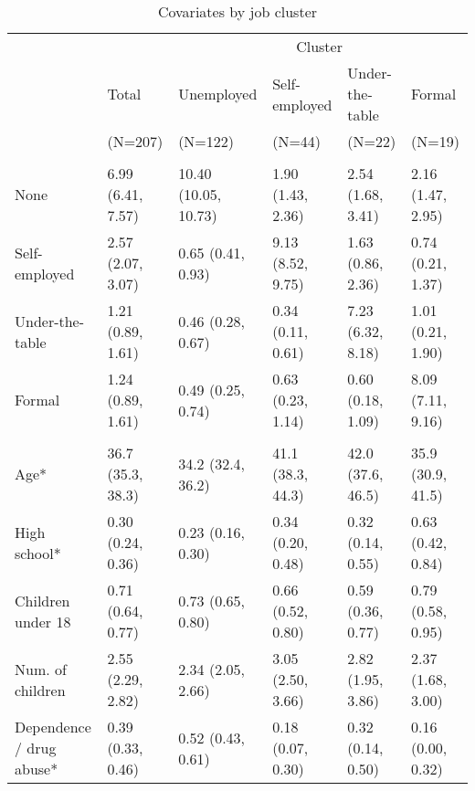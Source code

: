 
\begin{table}[htp]
\scriptsize
\caption{Covariates by job cluster}
\label{tab:desc_job_clusters}
\setlength{\tabcolsep}{5pt}
\renewcommand{\arraystretch}{1.3}
\begin{threeparttable}
\begin{tabular}{llllll}
\hline
\addlinespace[8pt]
& & \multicolumn{4}{c}{Cluster} \\
\addlinespace
\cmidrule(lr){3-6} 
\addlinespace
& \multicolumn{1}{l}{Total} & \multicolumn{1}{l}{Unemployed} & \multicolumn{1}{l}{Self-employed} & \multicolumn{1}{l}{Under-the-table} & \multicolumn{1}{l}{Formal} \\& \multicolumn{1}{l}{(N=207)} & \multicolumn{1}{l}{(N=122)} 
        & \multicolumn{1}{l}{(N=44)} & \multicolumn{1}{l}{(N=22)} 
        & \multicolumn{1}{l}{(N=19)} \\\addlinespace[8pt]
\hline
\addlinespace[12pt]
\multicolumn{6}{l}{\textbf{Time spent on job (months)}} \\
\addlinespace
\quad None & 6.99 (6.41, 7.57) & 10.40 (10.05, 10.73) & 1.90 (1.43, 2.36) & 2.54 (1.68, 3.41) & 2.16 (1.47, 2.95) \\ 
  \quad Self-employed & 2.57 (2.07, 3.07) & 0.65 (0.41, 0.93) & 9.13 (8.52, 9.75) & 1.63 (0.86, 2.36) & 0.74 (0.21, 1.37) \\ 
  \quad Under-the-table & 1.21 (0.89, 1.61) & 0.46 (0.28, 0.67) & 0.34 (0.11, 0.61) & 7.23 (6.32, 8.18) & 1.01 (0.21, 1.90) \\ 
  \quad Formal & 1.24 (0.89, 1.61) & 0.49 (0.25, 0.74) & 0.63 (0.23, 1.14) & 0.60 (0.18, 1.09) & 8.09 (7.11, 9.16) \\ 
  \addlinespace[12pt]
\multicolumn{6}{l}{\textbf{Covariates (average)*}} \\
\addlinespace
\quad Age* & 36.7 (35.3, 38.3) & 34.2 (32.4, 36.2) & 41.1 (38.3, 44.3) & 42.0 (37.6, 46.5) & 35.9 (30.9, 41.5) \\ 
  \quad High school* & 0.30 (0.24, 0.36) & 0.23 (0.16, 0.30) & 0.34 (0.20, 0.48) & 0.32 (0.14, 0.55) & 0.63 (0.42, 0.84) \\ 
  \quad Children under 18 & 0.71 (0.64, 0.77) & 0.73 (0.65, 0.80) & 0.66 (0.52, 0.80) & 0.59 (0.36, 0.77) & 0.79 (0.58, 0.95) \\ 
  \quad Num. of children & 2.55 (2.29, 2.82) & 2.34 (2.05, 2.66) & 3.05 (2.50, 3.66) & 2.82 (1.95, 3.86) & 2.37 (1.68, 3.00) \\ 
  \quad Dependence / drug abuse* & 0.39 (0.33, 0.46) & 0.52 (0.43, 0.61) & 0.18 (0.07, 0.30) & 0.32 (0.14, 0.50) & 0.16 (0.00, 0.32) \\ 

\end{tabular}
\end{threeparttable}
\end{table}
